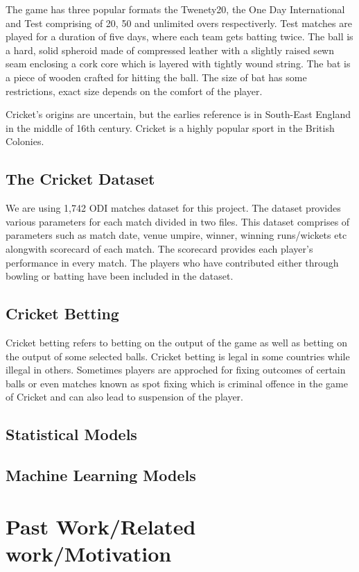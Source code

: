 \documentclass[fleqn,10pt]{wlscirep}
\begin{document}
The game has three popular formats the Twenety20, the One Day International and Test comprising of 20, 50 and unlimited overs respectiverly. Test matches are played for a
duration of five days, where each team gets batting twice.
The ball is a hard, solid spheroid made of compressed leather with a slightly raised sewn seam enclosing a cork core which is layered with tightly wound string. The bat is a
piece of wooden crafted for hitting the ball. The size of bat has some restrictions, exact size depends on the comfort of the player.

Cricket's origins are uncertain, but the earlies reference is in South-East England in the middle of 16th century. Cricket is a highly popular sport 
in the British Colonies.

\subsection{The Cricket Dataset}

We are using 1,742 ODI matches dataset for this project. The dataset provides various parameters for each match divided in two files.
This dataset comprises of parameters such as match date, venue umpire, winner, winning runs/wickets etc alongwith scorecard of each match.
The scorecard provides each player's performance in every match. The players who have contributed either through bowling or batting have been included in the dataset.

\subsection{Cricket Betting}
Cricket betting refers to betting on the output of the game as well as betting on the output of some selected balls.
Cricket betting is legal in some countries while illegal in others. Sometimes players are approched for fixing outcomes of certain balls 
or even matches known as spot fixing which is criminal offence in the game of Cricket and can also lead to suspension of the player.
\subsection{Statistical Models}
\subsection{Machine Learning Models}
\section{Past Work/Related work/Motivation}
\end{document}
